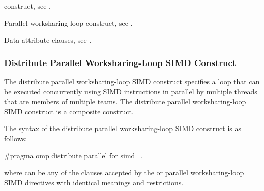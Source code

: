 \begin{crossrefs}
\item {} construct, see
.

\item Parallel worksharing-loop construct, see
.

\item Data attribute clauses, see
.
\end{crossrefs}



\subsubsection{Distribute Parallel Worksharing-Loop SIMD Construct}
\label{subsec:Distribute Parallel Worksharing-Loop SIMD Construct}
\summary
The distribute parallel worksharing-loop SIMD construct specifies a loop that 
can be executed concurrently using SIMD instructions in parallel by multiple 
threads that are members of multiple teams. The distribute parallel 
worksharing-loop SIMD construct is a composite construct.

\syntax
\begin{ccppspecific}
The syntax of the distribute parallel worksharing-loop SIMD construct is as follows:

\begin{ompcPragma}
#pragma omp distribute parallel for simd \
            \plc{[clause[ [},\plc{] clause] ... ] newline}
\end{ompcPragma}

where  can be any of the clauses accepted by the  
or parallel worksharing-loop SIMD directives with identical meanings and restrictions.
\end{ccppspecific}

